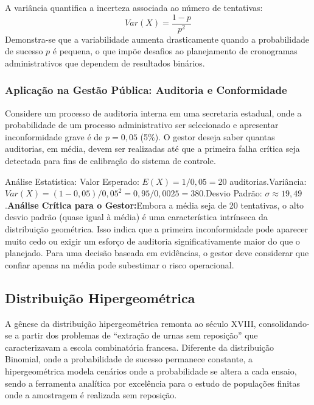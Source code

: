 
A variância quantifica a incerteza associada ao número de tentativas:$$Var(X)=\frac{1-p}{p^2}$$Demonstra-se que a variabilidade aumenta drasticamente quando a probabilidade de sucesso $p$ é pequena, o que impõe desafios ao planejamento de cronogramas administrativos que dependem de resultados binários.

\subsubsection*{Aplicação na Gestão Pública: Auditoria e Conformidade}

Considere um processo de auditoria interna em uma secretaria estadual, onde a probabilidade de um processo administrativo ser selecionado e apresentar inconformidade grave é de $p=0,05$ (5\%). O gestor deseja saber quantas auditorias, em média, devem ser realizadas até que a primeira falha crítica seja detectada para fins de calibração do sistema de controle. \vskip0.3cm

Análise Estatística: Valor Esperado: $E(X) = 1/0,05 = 20$ auditorias.Variância: $Var(X) = (1-0,05)/0,05^2 = 0,95/0,0025 = 380$.Desvio Padrão: $\sigma \approx 19,49$.\textbf{Análise Crítica para o Gestor:}Embora a média seja de 20 tentativas, o alto desvio padrão (quase igual à média) é uma característica intrínseca da distribuição geométrica. Isso indica que a primeira inconformidade pode aparecer muito cedo ou exigir um esforço de auditoria significativamente maior do que o planejado. Para uma decisão baseada em evidências, o gestor deve considerar que confiar apenas na média pode subestimar o risco operacional.



\newpage
\subsection{Distribuição Hipergeométrica}


A gênese da distribuição hipergeométrica remonta ao século XVIII, consolidando-se a partir dos problemas de ``extração de urnas sem reposição'' que caracterizavam a escola combinatória francesa. Diferente da distribuição Binomial, onde a probabilidade de sucesso permanece constante, a hipergeométrica modela cenários onde a probabilidade se altera a cada ensaio, sendo a ferramenta analítica por excelência para o estudo de populações finitas onde a amostragem é realizada sem reposição.

